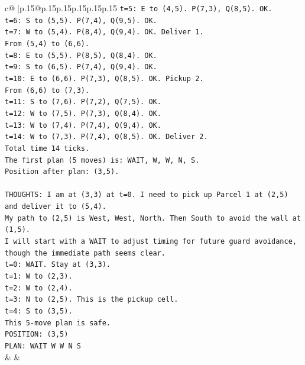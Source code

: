 \documentclass{article}
\begin{document}
{\begin{supertabular}{c@{$\;$}|p{.15\linewidth}@{}p{.15\linewidth}p{.15\linewidth}p{.15\linewidth}p{.15\linewidth}p{.15\linewidth}}
{{{\texttt{t=5: E to (4,5). P(7,3), Q(8,5). OK.} \\
\texttt{t=6: S to (5,5). P(7,4), Q(9,5). OK.} \\
\texttt{t=7: W to (5,4). P(8,4), Q(9,4). OK. Deliver 1.} \\
\texttt{From (5,4) to (6,6).} \\
\texttt{t=8: E to (5,5). P(8,5), Q(8,4). OK.} \\
\texttt{t=9: S to (6,5). P(7,4), Q(9,4). OK.} \\
\texttt{t=10: E to (6,6). P(7,3), Q(8,5). OK. Pickup 2.} \\
\texttt{From (6,6) to (7,3).} \\
\texttt{t=11: S to (7,6). P(7,2), Q(7,5). OK.} \\
\texttt{t=12: W to (7,5). P(7,3), Q(8,4). OK.} \\
\texttt{t=13: W to (7,4). P(7,4), Q(9,4). OK.} \\
\texttt{t=14: W to (7,3). P(7,4), Q(8,5). OK. Deliver 2.} \\
\texttt{Total time 14 ticks.} \\
\texttt{The first plan (5 moves) is: WAIT, W, W, N, S.} \\
\texttt{Position after plan: (3,5).} \\
\\ 
\texttt{THOUGHTS: I am at (3,3) at t=0. I need to pick up Parcel 1 at (2,5) and deliver it to (5,4).} \\
\texttt{My path to (2,5) is West, West, North. Then South to avoid the wall at (1,5).} \\
\texttt{I will start with a WAIT to adjust timing for future guard avoidance, though the immediate path seems clear.} \\
\texttt{t=0: WAIT. Stay at (3,3).} \\
\texttt{t=1: W to (2,3).} \\
\texttt{t=2: W to (2,4).} \\
\texttt{t=3: N to (2,5). This is the pickup cell.} \\
\texttt{t=4: S to (3,5).} \\
\texttt{This 5{-}move plan is safe.} \\
\texttt{POSITION: (3,5)} \\
\texttt{PLAN: WAIT W W N S} \\
            }
        }
    }
    & & \\ \\


\end{supertabular}}
\end{document}
